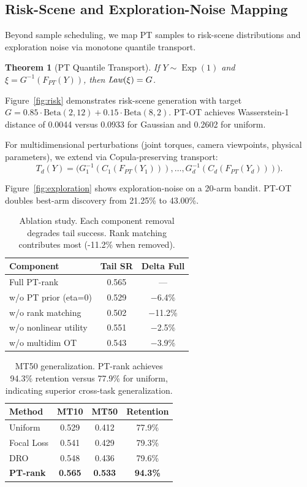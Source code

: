 \documentclass[twocolumn, a4paper, 11pt]{article}
\DeclareMathOperator{\Exp}{Exp}
\newtheorem{theorem}{Theorem}
\begin{document}
\pagebreak

\subsection{Risk-Scene and Exploration-Noise Mapping}

Beyond sample scheduling, we map PT samples to risk-scene distributions and exploration noise via monotone quantile transport.

\begin{theorem}[PT Quantile Transport]
If $Y\sim\Exp(1)$ and $\xi=G^{-1}(F_{PT}(Y))$, then $\emph{Law}(\xi)=G$.
\label{th:transport}
\end{theorem}

Figure~\ref{fig:risk} demonstrates risk-scene generation with target $G=0.85\cdot\text{Beta}(2,12)+0.15\cdot\text{Beta}(8,2)$. PT-OT achieves Wasserstein-1 distance of 0.0044 versus 0.0933 for Gaussian and 0.2602 for uniform.

For multidimensional perturbations (joint torques, camera viewpoints, physical parameters), we extend via Copula-preserving transport:
\begin{equation}
T_d(Y)=\bigl(G_1^{-1}(C_1(F_{PT}(Y_1))),\ldots,G_d^{-1}(C_d(F_{PT}(Y_d)))\bigr).
\label{eq:copula}
\end{equation}

Figure~\ref{fig:exploration} shows exploration-noise on a 20-arm bandit. PT-OT doubles best-arm discovery from 21.25\% to 43.00\%.

\begin{table}[t]
\caption{Ablation study. Each component removal degrades tail success. Rank matching contributes most (-11.2\% when removed).}
\label{tab:ablation}
\centering
\begin{tabular}{lcc}
\toprule
Component & Tail SR & Delta Full\\
\midrule
Full PT-rank & 0.565 & --- \\
w/o PT prior (eta=0) & 0.529 & $-$6.4\% \\
w/o rank matching & 0.502 & $-$11.2\% \\
w/o nonlinear utility & 0.551 & $-$2.5\% \\
w/o multidim OT & 0.543 & $-$3.9\% \\
\bottomrule
\end{tabular}
\end{table}

\begin{table}[t]
\caption{MT50 generalization. PT-rank achieves 94.3\% retention versus 77.9\% for uniform, indicating superior cross-task generalization.}
\label{tab:mt50}
\centering
\begin{tabular}{lccc}
\toprule
Method & MT10 & MT50 & Retention\\
\midrule
Uniform & 0.529 & 0.412 & 77.9\% \\
Focal Loss & 0.541 & 0.429 & 79.3\% \\
DRO & 0.548 & 0.436 & 79.6\% \\
\textbf{PT-rank} & \textbf{0.565} & \textbf{0.533} & \textbf{94.3\%} \\
\bottomrule
\end{tabular}
\end{table}
\end{document}
